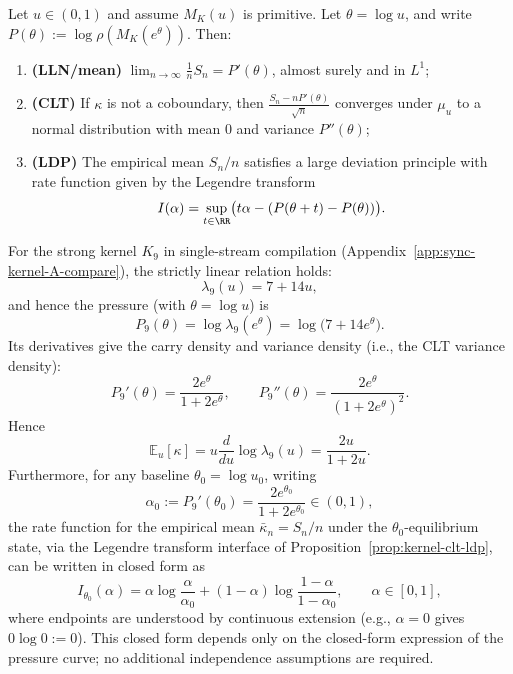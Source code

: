 \begin{proposition}\label{prop:kernel-clt-ldp}
Let $u\in(0,1)$ and assume $M_K(u)$ is primitive. Let $\theta=\log u$, and write
\(
P(\theta):=\log\rho(M_K(e^\theta))
\).
Then:
\begin{enumerate}
  \item \textbf{(LLN/mean)} $\lim_{n\to\infty}\frac{1}{n}S_n=P'(\theta)$, almost surely and in $L^1$;
  \item \textbf{(CLT)} If $\kappa$ is not a coboundary, then
  \(
  \frac{S_n-nP'(\theta)}{\sqrt{n}}
  \)
  converges under $\mu_u$ to a normal distribution with mean $0$ and variance $P''(\theta)$;
  \item \textbf{(LDP)} The empirical mean $S_n/n$ satisfies a large deviation principle with rate function given by the Legendre transform
  \[
  I(\alpha)=\sup_{t\in\RR}\bigl(t\alpha-(P(\theta+t)-P(\theta))\bigr).
  \]
\end{enumerate}
\end{proposition}

\begin{corollary}\label{cor:k9-integrable-pressure-ldp}
For the strong kernel \(K_9\) in single-stream compilation (Appendix~\ref{app:sync-kernel-A-compare}), the strictly linear relation holds:
$$
\lambda_9(u)=7+14u,
$$
and hence the pressure (with \(\theta=\log u\)) is
$$
P_9(\theta)=\log\lambda_9(e^\theta)=\log\!\bigl(7+14e^\theta\bigr).
$$
Its derivatives give the carry density and variance density (i.e., the CLT variance density):
$$
P_9'(\theta)=\frac{2e^\theta}{1+2e^\theta},\qquad
P_9''(\theta)=\frac{2e^\theta}{(1+2e^\theta)^2}.
$$
Hence
$$
\mathbb{E}_{u}[\kappa]=u\frac{d}{du}\log\lambda_9(u)=\frac{2u}{1+2u}.
$$
Furthermore, for any baseline \(\theta_0=\log u_0\), writing
$$
\alpha_0:=P_9'(\theta_0)=\frac{2e^{\theta_0}}{1+2e^{\theta_0}}\in(0,1),
$$
the rate function for the empirical mean \(\bar\kappa_n=S_n/n\) under the \(\theta_0\)-equilibrium state, via the Legendre transform interface of Proposition~\ref{prop:kernel-clt-ldp}, can be written in closed form as
$$
I_{\theta_0}(\alpha)
=\alpha\log\frac{\alpha}{\alpha_0}+(1-\alpha)\log\frac{1-\alpha}{1-\alpha_0},
\qquad \alpha\in[0,1],
$$
where endpoints are understood by continuous extension (e.g., \(\alpha=0\) gives \(0\log 0:=0\)).
This closed form depends only on the closed-form expression of the pressure curve; no additional independence assumptions are required.
\end{corollary}

